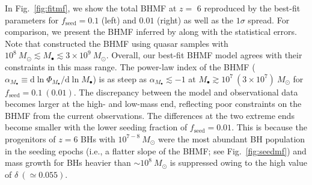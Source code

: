 \documentclass[twocolumn, twocolappendix]{aastex63}
\newcommand{\Msun}{M_\odot}
\newcommand{\Mbh}{M_\bullet}
\newcommand{\fseed}{f_\mathrm{seed}}
\newcommand{\D}{\mathrm{d}}
\begin{document}
\begin{CJK*}{UTF8}{gbsn}
In Fig.~\ref{fig:fitmf}, we show the total BHMF at $z=$ 6 reproduced by the best-fit parameters for 
$\fseed = 0.1$ (left) and $0.01$ (right) as well as the $1\sigma$ spread.
For comparison, we present the BHMF inferred by  along with the statistical errors.
Note that  constructed the BHMF using quasar samples with 
$10^8~\Msun \lesssim \Mbh \lesssim 3\times 10^9~\Msun$.
Overall, our best-fit BHMF model agrees with their constraints in this mass range.
The power-law index of the BHMF ($\alpha_{M_\bullet} \equiv \D \ln \Phi_{M_\bullet}/\D \ln M_\bullet$) is as steep as $\alpha_{M_\bullet}\lesssim -1$
at $M_\bullet \gtrsim 10^7~(3\times 10^7)~\Msun$ for $\fseed = 0.1 ~(0.01)$.
The discrepancy between the model and observational data becomes larger at the high- and low-mass end,
reflecting poor constraints on the BHMF from the current observations.
The differences at the two extreme ends become smaller with the lower seeding fraction of $\fseed = 0.01$.
This is because the progenitors of $z=6$ BHs with $10^{7-8}~\Msun$ were the most abundant BH population 
in the seeding epochs (i.e., a flatter slope of the BHMF; see Fig.~\ref{fig:seedmf}) and mass growth for BHs heavier than 
$\sim 10^8~\Msun$ is suppressed owing to the high value of $\delta~(\simeq 0.055)$.



\end{CJK*}
\end{document}
